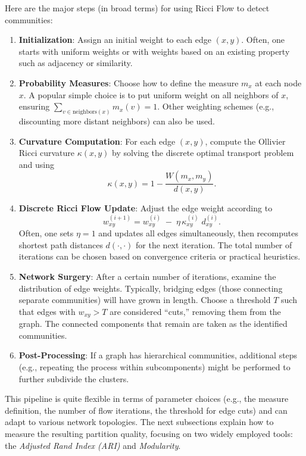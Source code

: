 Here are the major steps (in broad terms) for using Ricci Flow to detect communities:
\begin{enumerate}
    \item \textbf{Initialization}: Assign an initial weight to each edge $(x,y)$. Often, one starts with uniform weights or with weights based on an existing property such as adjacency or similarity.
    \item \textbf{Probability Measures}: Choose how to define the measure $m_x$ at each node $x$. A popular simple choice is to put uniform weight on all neighbors of $x$, ensuring $\sum_{v \in \text{neighbors}(x)} m_x(v)=1$. Other weighting schemes (e.g., discounting more distant neighbors) can also be used.
    \item \textbf{Curvature Computation}: For each edge $(x,y)$, compute the Ollivier Ricci curvature $\kappa(x,y)$ by solving the discrete optimal transport problem and using 
    \[
    \kappa(x,y) = 1 - \frac{W(m_x, m_y)}{d(x,y)}.
    \]
    \item \textbf{Discrete Ricci Flow Update}: Adjust the edge weight according to
    \[
    w_{xy}^{(i+1)} = w_{xy}^{(i)} \;-\; \eta \,\kappa_{xy}^{(i)} \; d_{xy}^{(i)}.
    \]
    Often, one sets $\eta=1$ and updates all edges simultaneously, then recomputes shortest path distances $d(\cdot,\cdot)$ for the next iteration. The total number of iterations can be chosen based on convergence criteria or practical heuristics.
    \item \textbf{Network Surgery}: After a certain number of iterations, examine the distribution of edge weights. Typically, bridging edges (those connecting separate communities) will have grown in length. Choose a threshold $T$ such that edges with $w_{xy} > T$ are considered “cuts,” removing them from the graph. The connected components that remain are taken as the identified communities.
    \item \textbf{Post-Processing}: If a graph has hierarchical communities, additional steps (e.g., repeating the process within subcomponents) might be performed to further subdivide the clusters.
\end{enumerate}

This pipeline is quite flexible in terms of parameter choices (e.g., the measure definition, the number of flow iterations, the threshold for edge cuts) and can adapt to various network topologies. The next subsections explain how to measure the resulting partition quality, focusing on two widely employed tools: the \emph{Adjusted Rand Index (ARI)} and \emph{Modularity}.

